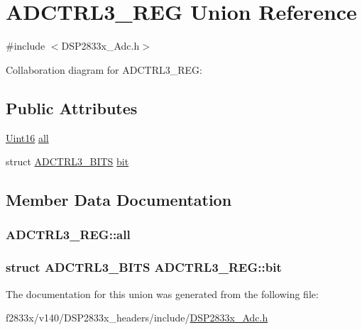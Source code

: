 \hypertarget{union_a_d_c_t_r_l3___r_e_g}{}\section{A\+D\+C\+T\+R\+L3\+\_\+\+R\+E\+G Union Reference}
\label{union_a_d_c_t_r_l3___r_e_g}


{\ttfamily \#include $<$D\+S\+P2833x\+\_\+\+Adc.\+h$>$}



Collaboration diagram for A\+D\+C\+T\+R\+L3\+\_\+\+R\+E\+G\+:
\subsection*{Public Attributes}
\begin{DoxyCompactItemize}
\item 
\hyperlink{_d_s_p2833x___device_8h_a59a9f6be4562c327cbfb4f7e8e18f08b}{Uint16} \hyperlink{union_a_d_c_t_r_l3___r_e_g_ac5a75969321f6d4c4d5de5246ccb9d87}{all}
\item 
struct \hyperlink{struct_a_d_c_t_r_l3___b_i_t_s}{A\+D\+C\+T\+R\+L3\+\_\+\+B\+I\+T\+S} \hyperlink{union_a_d_c_t_r_l3___r_e_g_a232043623ca9b23a11a868360d2a8eb5}{bit}
\end{DoxyCompactItemize}


\subsection{Member Data Documentation}
\hypertarget{union_a_d_c_t_r_l3___r_e_g_ac5a75969321f6d4c4d5de5246ccb9d87}{}
\subsubsection[{all}]{ A\+D\+C\+T\+R\+L3\+\_\+\+R\+E\+G\+::all}\label{union_a_d_c_t_r_l3___r_e_g_ac5a75969321f6d4c4d5de5246ccb9d87}
\hypertarget{union_a_d_c_t_r_l3___r_e_g_a232043623ca9b23a11a868360d2a8eb5}{}
\subsubsection[{bit}]{\setlength{\rightskip}{0pt plus 5cm}struct {\bf A\+D\+C\+T\+R\+L3\+\_\+\+B\+I\+T\+S} A\+D\+C\+T\+R\+L3\+\_\+\+R\+E\+G\+::bit}\label{union_a_d_c_t_r_l3___r_e_g_a232043623ca9b23a11a868360d2a8eb5}


The documentation for this union was generated from the following file\+:\begin{DoxyCompactItemize}
\item 
f2833x/v140/\+D\+S\+P2833x\+\_\+headers/include/\hyperlink{_d_s_p2833x___adc_8h}{D\+S\+P2833x\+\_\+\+Adc.\+h}\end{DoxyCompactItemize}
